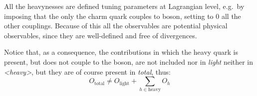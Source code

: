 All the heavynesses are defined tuning parameters at Lagrangian level, e.g.\ by
imposing that the only the charm quark couples to \ew boson, setting to 0 all
the other couplings.
Because of this all the observables are potential physical observables, since
they are well-defined and free of divergences.

Notice that, as a consequence, the contributions in which the heavy quark is
present, but does not couple to the \ew boson, are not included nor in
\textit{light} neither in \textit{<heavy>}, but they are of course present in
\textit{total}, thus:
\begin{equation}
  O_{\text{total}} \neq O_{\text{light}} + \sum_{h \in \text{heavy}} O_h 
\end{equation}

